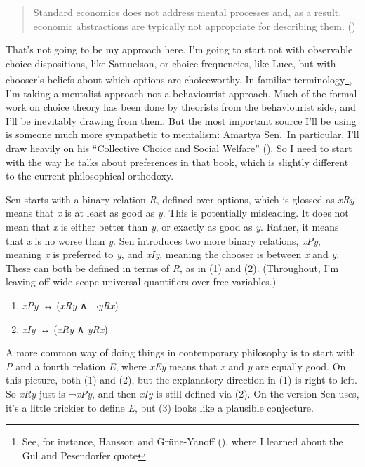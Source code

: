 \documentclass[
  11pt,
  letterpaper,
  DIV=11,
  numbers=noendperiod,
  twoside]{scrartcl}
\providecommand{\tightlist}{%
  \setlength{\itemsep}{0pt}\setlength{\parskip}{0pt}}
\begin{document}
\begin{quote}
Standard economics does not address mental processes and, as a result,
economic abstractions are typically not appropriate for describing them.
()
\end{quote}

That's not going to be my approach here. I'm going to start not with
observable choice dispositions, like Samuelson, or choice frequencies,
like Luce, but with chooser's beliefs about which options are
choiceworthy. In familiar terminology\footnote{See, for instance,
  Hansson and Grüne-Yanoff (), where
  I learned about the Gul and Pesendorfer quote}, I'm taking a mentalist
approach not a behaviourist approach. Much of the formal work on choice
theory has been done by theorists from the behaviourist side, and I'll
be inevitably drawing from them. But the most important source I'll be
using is someone much more sympathetic to mentalism: Amartya Sen.~In
particular, I'll draw heavily on his ``Collective Choice and Social
Welfare'' (). So I need to
start with the way he talks about preferences in that book, which is
slightly different to the current philosophical orthodoxy.

Sen starts with a binary relation \emph{R}, defined over options, which
is glossed as \emph{xRy} means that \emph{x} is at least as good as
\emph{y}. This is potentially misleading. It does not mean that \emph{x}
is either better than \emph{y}, or exactly as good as \emph{y}. Rather,
it means that \emph{x} is no worse than \emph{y}. Sen introduces two
more binary relations, \emph{xPy}, meaning \emph{x} is preferred to
\emph{y}, and \emph{xIy}, meaning the chooser is between \emph{x} and
\emph{y}. These can both be defined in terms of \emph{R}, as in (1) and
(2). (Throughout, I'm leaving off wide scope universal quantifiers over
free variables.)

\begin{enumerate}
\def\labelenumi{(\arabic{enumi})}
\tightlist
\item
  \emph{xPy}~↔︎ (\emph{xRy} ∧ ¬\emph{yRx})
\item
  \emph{xIy}~↔︎ (\emph{xRy} ∧ \emph{yRx})
\end{enumerate}

A more common way of doing things in contemporary philosophy is to start
with \emph{P} and a fourth relation \emph{E}, where \emph{xEy} means
that \emph{x} and \emph{y} are equally good. On this picture, both (1)
and (2), but the explanatory direction in (1) is right-to-left. So
\emph{xRy} just is ¬\emph{xPy}, and then \emph{xIy} is still defined via
(2). On the version Sen uses, it's a little trickier to define \emph{E},
but (3) looks like a plausible conjecture.
\end{document}
